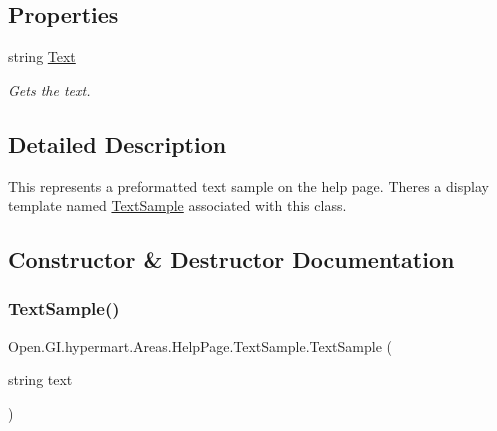 \subsection*{Properties}
\begin{DoxyCompactItemize}
\item 
string \hyperlink{class_open_1_1_g_i_1_1hypermart_1_1_areas_1_1_help_page_1_1_text_sample_aac44397744d5ca5d933bc1d85b07eda6}{Text}
\begin{DoxyCompactList}\small\item\em Gets the text. \end{DoxyCompactList}\end{DoxyCompactItemize}


\subsection{Detailed Description}
This represents a preformatted text sample on the help page. There\textquotesingle{}s a display template named \hyperlink{class_open_1_1_g_i_1_1hypermart_1_1_areas_1_1_help_page_1_1_text_sample}{Text\+Sample} associated with this class. 



\subsection{Constructor \& Destructor Documentation}
\hypertarget{class_open_1_1_g_i_1_1hypermart_1_1_areas_1_1_help_page_1_1_text_sample_aa2097f4582d638f73b4982201ab7e3e3}{}\label{class_open_1_1_g_i_1_1hypermart_1_1_areas_1_1_help_page_1_1_text_sample_aa2097f4582d638f73b4982201ab7e3e3} 
\subsubsection{\texorpdfstring{Text\+Sample()}{TextSample()}}
{\footnotesize\ttfamily Open.\+G\+I.\+hypermart.\+Areas.\+Help\+Page.\+Text\+Sample.\+Text\+Sample (\begin{DoxyParamCaption}\item[{string}]{text }\end{DoxyParamCaption})}



